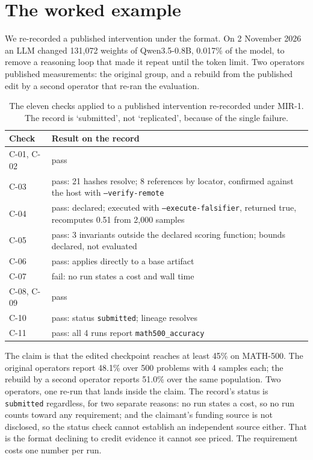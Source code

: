 \documentclass[11pt]{article}
\begin{document}
\section{The worked example}
\label{sec:worked}

We re-recorded a published intervention under the format. On 2 November 2026 an
LLM changed 131,072 weights of Qwen3.5-0.8B, 0.017\% of the model, to remove a
reasoning loop that made it repeat until the token limit. Two operators
published measurements: the original group, and a rebuild from the published
edit by a second operator that re-ran the evaluation.

\begin{table}[h]
\centering
\begin{tabular}{@{}l p{}@{}}
\toprule
Check & Result on the record \\
\midrule
C-01, C-02 & pass \\
C-03 & pass: 21 hashes resolve; 8 references by locator, confirmed against the host with \texttt{--verify-remote} \\
C-04 & pass: declared; executed with \texttt{--execute-falsifier}, returned true, recomputes 0.51 from 2,000 samples \\
C-05 & pass: 3 invariants outside the declared scoring function; bounds declared, not evaluated \\
C-06 & pass: applies directly to a base artifact \\
C-07 & fail: no run states a cost and wall time \\
C-08, C-09 & pass \\
C-10 & pass: status \texttt{submitted}; lineage resolves \\
C-11 & pass: all 4 runs report \texttt{math500\_accuracy} \\
\bottomrule
\end{tabular}
\caption{The eleven checks applied to a published intervention re-recorded under
MIR-1. The record is `submitted', not `replicated', because of the single
failure.}
\end{table}

The claim is that the edited checkpoint reaches at least 45\% on MATH-500. The
original operators report 48.1\% over 500 problems with 4 samples each; the
rebuild by a second operator reports 51.0\% over the same population. Two
operators, one re-run that lands inside the claim. The record's status is \texttt{submitted}
regardless, for two separate reasons: no run states a cost, so no run counts
toward any requirement; and the claimant's funding source is not disclosed, so
the status check cannot establish an independent source either. That is the
format declining to credit evidence it cannot see priced. The requirement costs
one number per run.
\end{document}
